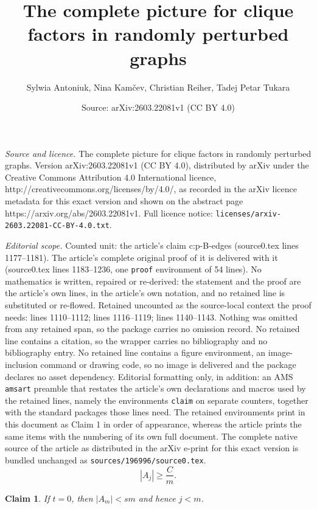 \documentclass[10pt,a4paper]{amsart}
\title{The complete picture for clique factors in randomly perturbed graphs}
\author{Sylwia Antoniuk, Nina Kam\v{c}ev, Christian Reiher, Tadej Petar Tukara}
\date{Source: arXiv:2603.22081v1 (CC BY 4.0)}
\newtheorem{claim}{Claim}
\begin{document}
\maketitle

\noindent\emph{Source and licence.} The complete picture for clique factors in randomly perturbed graphs. Version arXiv:2603.22081v1 (CC BY 4.0), distributed by arXiv under the Creative Commons Attribution 4.0 International licence, http://creativecommons.org/licenses/by/4.0/, as recorded in the arXiv licence metadata for this exact version and shown on the abstract page https://arxiv.org/abs/2603.22081v1. Full licence notice: \texttt{licenses/arxiv-2603.22081-CC-BY-4.0.txt}.\par\smallskip

\noindent\textit{Editorial scope.} Counted unit: the article's claim c:p-B-edges (source0.tex lines 1177--1181). The article's complete original proof of it is delivered with it (source0.tex lines 1183--1236, one \texttt{proof} environment of 54 lines). No mathematics is written, repaired or re-derived: the statement and the proof are the article's own lines, in the article's own notation, and no retained line is substituted or re-flowed.  Retained uncounted as the source-local context the proof needs: lines 1110--1112; lines 1116--1119; lines 1140--1143.  Nothing was omitted from any retained span, so the package carries no omission record.  No retained line contains a citation, so the wrapper carries no bibliography and no bibliography entry.  No retained line contains a figure environment, an image-inclusion command or drawing code, so no image is delivered and the package declares no asset dependency.  Editorial formatting only, in addition: an AMS \texttt{amsart} preamble that restates the article's own declarations and macros used by the retained lines, namely the environments \texttt{claim} on separate counters, together with the standard packages those lines need.  The retained environments print in this document as Claim 1 in order of appearance, whereas the article prints the same items with the numbering of its own full document.  The complete native source of the article as distributed in the arXiv e-print for this exact version is bundled unchanged as \texttt{sources/196996/source0.tex}.
        \begin{equation}\label{eq:A_j}
            |A_j|\geq \frac{C}{m}.
        \end{equation}

        \begin{claim}
            \label{c:singular-A_m}
            If $t=0$, then $|A_m|< sm$ and hence $j<m$.
        \end{claim}
\end{document}
